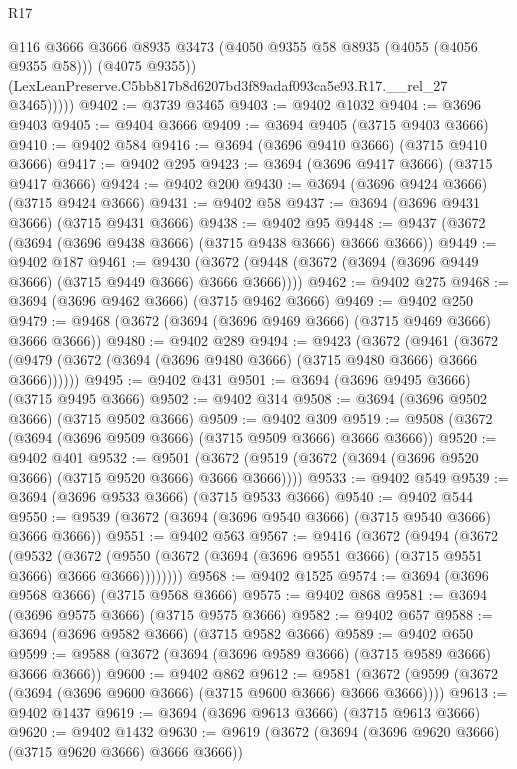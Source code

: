 \begin{lexlean}{R17}
\begin{coremodule}
              @116
              @3666
              @3666
              @8935
              @3473
              (@4050 @9355 @58 @8935 (@4055 (@4056 @9355 @58)))
              (@4075 @9355))
            (LexLeanPreserve.C5bb817b8d6207bd3f89adaf093ca5e93.R17.__rel_27 @3465)))))
@9402 := @3739 @3465
@9403 := @9402 @1032
@9404 := @3696 @9403
@9405 := @9404 @3666
@9409 := @3694 @9405 (@3715 @9403 @3666)
@9410 := @9402 @584
@9416 := @3694 (@3696 @9410 @3666) (@3715 @9410 @3666)
@9417 := @9402 @295
@9423 := @3694 (@3696 @9417 @3666) (@3715 @9417 @3666)
@9424 := @9402 @200
@9430 := @3694 (@3696 @9424 @3666) (@3715 @9424 @3666)
@9431 := @9402 @58
@9437 := @3694 (@3696 @9431 @3666) (@3715 @9431 @3666)
@9438 := @9402 @95
@9448 := @9437 (@3672 (@3694 (@3696 @9438 @3666) (@3715 @9438 @3666) @3666 @3666))
@9449 := @9402 @187
@9461 := @9430 (@3672 (@9448 (@3672 (@3694 (@3696 @9449 @3666) (@3715 @9449 @3666) @3666 @3666))))
@9462 := @9402 @275
@9468 := @3694 (@3696 @9462 @3666) (@3715 @9462 @3666)
@9469 := @9402 @250
@9479 := @9468 (@3672 (@3694 (@3696 @9469 @3666) (@3715 @9469 @3666) @3666 @3666))
@9480 := @9402 @289
@9494 := @9423
    (@3672
      (@9461 (@3672 (@9479 (@3672 (@3694 (@3696 @9480 @3666) (@3715 @9480 @3666) @3666 @3666))))))
@9495 := @9402 @431
@9501 := @3694 (@3696 @9495 @3666) (@3715 @9495 @3666)
@9502 := @9402 @314
@9508 := @3694 (@3696 @9502 @3666) (@3715 @9502 @3666)
@9509 := @9402 @309
@9519 := @9508 (@3672 (@3694 (@3696 @9509 @3666) (@3715 @9509 @3666) @3666 @3666))
@9520 := @9402 @401
@9532 := @9501 (@3672 (@9519 (@3672 (@3694 (@3696 @9520 @3666) (@3715 @9520 @3666) @3666 @3666))))
@9533 := @9402 @549
@9539 := @3694 (@3696 @9533 @3666) (@3715 @9533 @3666)
@9540 := @9402 @544
@9550 := @9539 (@3672 (@3694 (@3696 @9540 @3666) (@3715 @9540 @3666) @3666 @3666))
@9551 := @9402 @563
@9567 := @9416
    (@3672
      (@9494
        (@3672
          (@9532
            (@3672 (@9550 (@3672 (@3694 (@3696 @9551 @3666) (@3715 @9551 @3666) @3666 @3666))))))))
@9568 := @9402 @1525
@9574 := @3694 (@3696 @9568 @3666) (@3715 @9568 @3666)
@9575 := @9402 @868
@9581 := @3694 (@3696 @9575 @3666) (@3715 @9575 @3666)
@9582 := @9402 @657
@9588 := @3694 (@3696 @9582 @3666) (@3715 @9582 @3666)
@9589 := @9402 @650
@9599 := @9588 (@3672 (@3694 (@3696 @9589 @3666) (@3715 @9589 @3666) @3666 @3666))
@9600 := @9402 @862
@9612 := @9581 (@3672 (@9599 (@3672 (@3694 (@3696 @9600 @3666) (@3715 @9600 @3666) @3666 @3666))))
@9613 := @9402 @1437
@9619 := @3694 (@3696 @9613 @3666) (@3715 @9613 @3666)
@9620 := @9402 @1432
@9630 := @9619 (@3672 (@3694 (@3696 @9620 @3666) (@3715 @9620 @3666) @3666 @3666))

\end{coremodule}
\end{lexlean}
